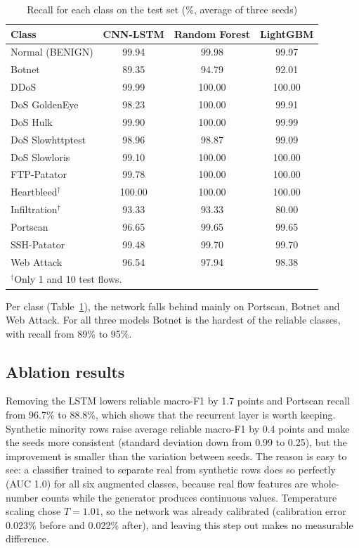 \documentclass[conference]{IEEEtran}
\begin{document}
\begin{table}[t]
\caption{Recall for each class on the test set (\%, average of three seeds)}
\label{tab:perclass}
\centering
\scriptsize
\begin{tabular}{lccc}
\toprule
Class & CNN-LSTM & Random Forest & LightGBM \\
\midrule
Normal (BENIGN) & 99.94 & 99.98 & 99.97 \\
Botnet & 89.35 & 94.79 & 92.01 \\
DDoS & 99.99 & 100.00 & 100.00 \\
DoS GoldenEye & 98.23 & 100.00 & 99.91 \\
DoS Hulk & 99.90 & 100.00 & 99.99 \\
DoS Slowhttptest & 98.96 & 98.87 & 99.09 \\
DoS Slowloris & 99.10 & 100.00 & 100.00 \\
FTP-Patator & 99.78 & 100.00 & 100.00 \\
Heartbleed$^\dagger$ & 100.00 & 100.00 & 100.00 \\
Infiltration$^\dagger$ & 93.33 & 93.33 & 80.00 \\
Portscan & 96.65 & 99.65 & 99.65 \\
SSH-Patator & 99.48 & 99.70 & 99.70 \\
Web Attack & 96.54 & 97.94 & 98.38 \\
\bottomrule
\multicolumn{4}{l}{$^\dagger$Only 1 and 10 test flows.}
\end{tabular}
\end{table}

Per class (Table~\ref{tab:perclass}), the network falls behind mainly on Portscan, Botnet and Web
Attack. For all three models Botnet is the hardest of the reliable classes, with recall from 89\% to 95\%.

\subsection{Ablation results}
Removing the LSTM lowers reliable macro-F1 by 1.7 points and Portscan recall from 96.7\% to 88.8\%,
which shows that the recurrent layer is worth keeping. Synthetic minority rows raise average
reliable macro-F1 by 0.4 points and make the seeds more consistent (standard deviation down from
0.99 to 0.25), but the improvement is smaller than the variation between seeds. The reason is easy
to see: a classifier trained to separate real from synthetic rows does so perfectly (AUC 1.0) for
all six augmented classes, because real flow features are whole-number counts while the generator
produces continuous values. Temperature scaling chose $T=1.01$, so the network was already
calibrated (calibration error 0.023\% before and 0.022\% after), and leaving this step out makes no
measurable difference.
\end{document}
